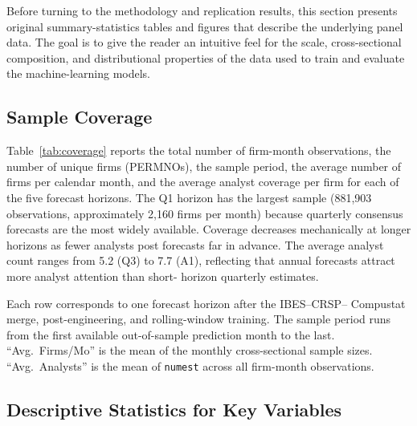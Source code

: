 \documentclass[12pt]{article}
\begin{document}
Before turning to the methodology and replication results, this section
presents original summary-statistics tables and figures that describe the
underlying panel data.  The goal is to give the reader an intuitive feel for
the scale, cross-sectional composition, and distributional properties of the
data used to train and evaluate the machine-learning models.

\subsection{Sample Coverage}

Table~\ref{tab:coverage} reports the total number of firm-month observations,
the number of unique firms (PERMNOs), the sample period, the average number
of firms per calendar month, and the average analyst coverage per firm for
each of the five forecast horizons.  The Q1 horizon has the largest sample
(881{,}903 observations, approximately 2{,}160 firms per month) because
quarterly consensus forecasts are the most widely available.  Coverage
decreases mechanically at longer horizons as fewer analysts post forecasts
far in advance.  The average analyst count ranges from 5.2 (Q3) to 7.7 (A1),
reflecting that annual forecasts attract more analyst attention than short-
horizon quarterly estimates.

\begin{table}[H]
\centering
\caption{Sample Coverage by Forecast Horizon}
\label{tab:coverage}
\begin{threeparttable}
\small

\begin{tablenotes}
  \footnotesize
  \item Each row corresponds to one forecast horizon after the IBES--CRSP--
  Compustat merge, post-engineering, and rolling-window training.  The sample
  period runs from the first available out-of-sample prediction month to the
  last.  ``Avg.~Firms/Mo'' is the mean of the monthly cross-sectional sample
  sizes.  ``Avg.~Analysts'' is the mean of \texttt{numest} across all
  firm-month observations.
\end{tablenotes}
\end{threeparttable}
\end{table}

\subsection{Descriptive Statistics for Key Variables}
\end{document}
